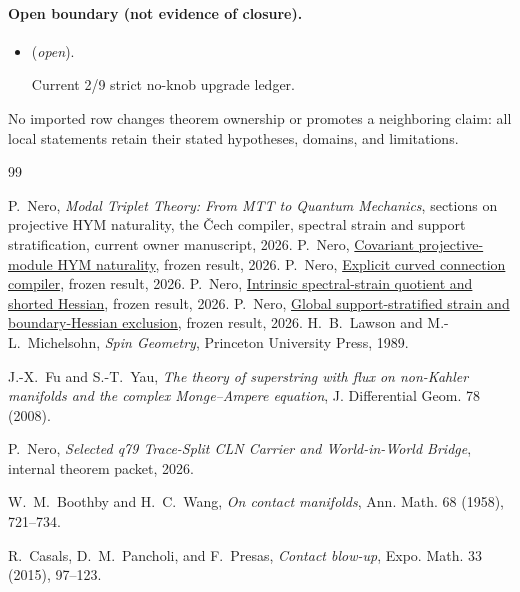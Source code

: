 \documentclass[11pt]{article}
\newcommand{\frozenresult}[2]{\href{https://github.com/PeterNero/mtt-results-repro/blob/f141a20ea23c5c3ff19cc2161c0e226e29ade8a7/release/results/#1/artifact.json}{#2}}
\begin{document}
\paragraph{Open boundary (not evidence of closure).}
\begin{itemize}
\setlength{\itemsep}{0.25em}
\item {} (\emph{open}).\par Current 2/9 strict no-knob upgrade ledger.
\end{itemize}

No imported row changes theorem ownership or promotes a neighboring claim: all local statements retain their stated hypotheses, domains, and limitations.

\begin{thebibliography}{99}

 P.~Nero, \emph{Modal Triplet Theory: From MTT to Quantum Mechanics}, sections on projective HYM naturality, the \v{C}ech compiler, spectral strain and support stratification, current owner manuscript, 2026.
 P.~Nero, \frozenresult{q79_projective_hym_naturality}{Covariant projective-module HYM naturality}, frozen result, 2026.
 P.~Nero, \frozenresult{q79_cech_projector_compiler}{Explicit curved connection compiler}, frozen result, 2026.
 P.~Nero, \frozenresult{q79_spectral_strain_hessian}{Intrinsic spectral-strain quotient and shorted Hessian}, frozen result, 2026.
 P.~Nero, \frozenresult{q79_support_stratified_strain}{Global support-stratified strain and boundary-Hessian exclusion}, frozen result, 2026.
H.~B.~Lawson and M.-L.~Michelsohn,
\emph{Spin Geometry}, Princeton University Press, 1989.

J.-X.~Fu and S.-T.~Yau,
\emph{The theory of superstring with flux on non-Kahler manifolds and the
complex Monge--Ampere equation}, J. Differential Geom. 78 (2008).

P.~Nero,
\emph{Selected q79 Trace-Split CLN Carrier and World-in-World Bridge},
internal theorem packet, 2026.

W.~M.~Boothby and H.~C.~Wang,
\emph{On contact manifolds}, Ann. Math. 68 (1958), 721--734.

R.~Casals, D.~M.~Pancholi, and F.~Presas,
\emph{Contact blow-up}, Expo. Math. 33 (2015), 97--123.


\end{thebibliography}
\end{document}
